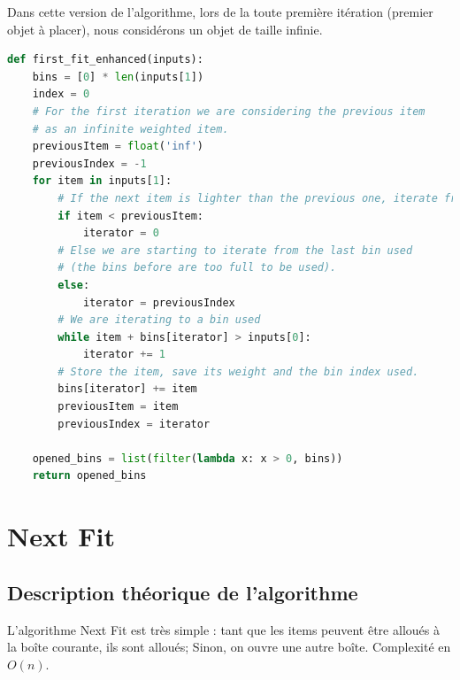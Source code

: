 \documentclass{article}
\begin{document}
Dans cette version de l'algorithme, lors de la toute première itération (premier objet à placer), nous considérons un objet de taille infinie.

\begin{lstlisting}[language=Python, frame=single]
def first_fit_enhanced(inputs):
    bins = [0] * len(inputs[1])
    index = 0
    # For the first iteration we are considering the previous item
    # as an infinite weighted item.
    previousItem = float('inf')
    previousIndex = -1
    for item in inputs[1]:
        # If the next item is lighter than the previous one, iterate from 0
        if item < previousItem:
            iterator = 0
        # Else we are starting to iterate from the last bin used
        # (the bins before are too full to be used).
        else:
            iterator = previousIndex
        # We are iterating to a bin used
        while item + bins[iterator] > inputs[0]:
            iterator += 1
        # Store the item, save its weight and the bin index used.
        bins[iterator] += item
        previousItem = item
        previousIndex = iterator

    opened_bins = list(filter(lambda x: x > 0, bins))
    return opened_bins
\end{lstlisting}



\section{Next Fit}

\subsection{Description théorique de l'algorithme}
L'algorithme Next Fit est très simple : tant que les items peuvent être alloués à la boîte courante, ils sont alloués; Sinon, on ouvre une autre boîte.
Complexité en $O(n)$.
\end{document}
